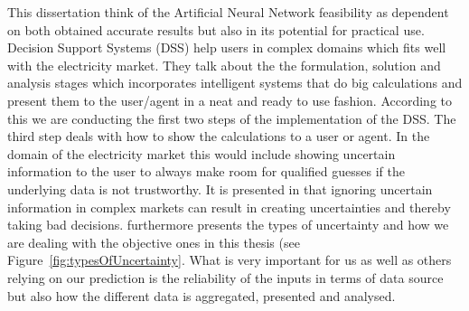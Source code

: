 This dissertation think of the Artificial Neural Network feasibility as dependent on both obtained accurate results but also in its potential for practical use. Decision Support Systems (DSS) help users in complex domains which fits well with the electricity market. They talk about the the formulation, solution and analysis stages which incorporates intelligent systems that do big calculations and present them to the user/agent in a neat and ready to use fashion. According to this we are conducting the first two steps of the implementation of the DSS. The third step deals with how to show the calculations to a user or agent. In the domain of the electricity market this would include showing uncertain information to the user to always make room for qualified guesses if the underlying data is not trustworthy. It is presented in \cite{UncertainInformation} that ignoring uncertain information in complex markets can result in creating uncertainties and thereby taking bad decisions. \cite{UncertainInformation} furthermore presents the types of uncertainty and how we are dealing with the objective ones in this thesis (see Figure~\ref{fig:typesOfUncertainty}. What is very important for us as well as others relying on our prediction is the reliability of the inputs in terms of data source but also how the different data is aggregated, presented and analysed.